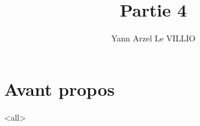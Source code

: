 
%


\title{Partie 4}
\author{Yann Arzel Le VILLIO}



\maketitle

\section{Avant propos}





\mode<all>{}



